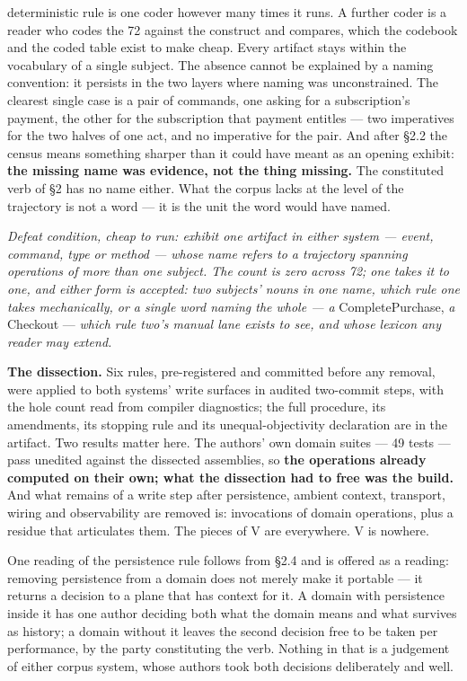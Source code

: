 \documentclass[
]{article}
\begin{document}
deterministic rule is one coder however many times it runs. A further
coder is a reader who codes the 72 against the construct and compares,
which the codebook and the coded table exist to make cheap. Every
artifact stays within the vocabulary of a single subject. The absence
cannot be explained by a naming convention: it persists in the two
layers where naming was unconstrained. The clearest single case is a
pair of commands, one asking for a subscription's payment, the other for
the subscription that payment entitles --- two imperatives for the two
halves of one act, and no imperative for the pair. And after §2.2 the
census means something sharper than it could have meant as an opening
exhibit: \textbf{the missing name was evidence, not the thing missing.}
The constituted verb of §2 has no name either. What the corpus lacks at
the level of the trajectory is not a word --- it is the unit the word
would have named.

\emph{Defeat condition, cheap to run: exhibit one artifact in either
system --- event, command, type or method --- whose name refers to a
trajectory spanning operations of more than one subject. The count is
zero across 72; one takes it to one, and either form is accepted: two
subjects' nouns in one name, which rule one takes mechanically, or a
single word naming the whole --- a} CompletePurchase, \emph{a} Checkout
--- \emph{which rule two's manual lane exists to see, and whose lexicon
any reader may extend.}

\textbf{The dissection.} Six rules, pre-registered and committed before
any removal, were applied to both systems' write surfaces in audited
two-commit steps, with the hole count read from compiler diagnostics;
the full procedure, its amendments, its stopping rule and its
unequal-objectivity declaration are in the artifact. Two results matter
here. The authors' own domain suites --- 49 tests --- pass unedited
against the dissected assemblies, so \textbf{the operations already
computed on their own; what the dissection had to free was the build.}
And what remains of a write step after persistence, ambient context,
transport, wiring and observability are removed is: invocations of
domain operations, plus a residue that articulates them. The pieces of V
are everywhere. V is nowhere.

One reading of the persistence rule follows from §2.4 and is offered as
a reading: removing persistence from a domain does not merely make it
portable --- it returns a decision to a plane that has context for it. A
domain with persistence inside it has one author deciding both what the
domain means and what survives as history; a domain without it leaves
the second decision free to be taken per performance, by the party
constituting the verb. Nothing in that is a judgement of either corpus
system, whose authors took both decisions deliberately and well.
\end{document}
